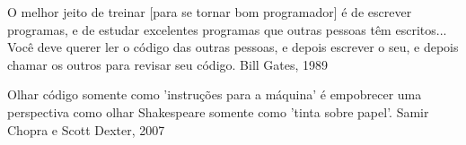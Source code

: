 



O melhor jeito de treinar [para se tornar bom programador] é de escrever programas, e de estudar excelentes programas que outras pessoas têm escritos... Você deve querer ler o código das outras pessoas, e depois escrever o seu, e depois chamar os outros para revisar seu código.
Bill Gates, 1989



Olhar código somente como 'instruções para a máquina' é empobrecer uma perspectiva como olhar Shakespeare somente como 'tinta sobre papel'.
Samir Chopra e Scott Dexter, 2007
